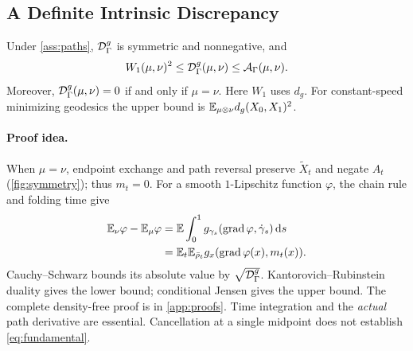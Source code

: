 \subsection{A Definite Intrinsic Discrepancy}

\begin{theorem}
\label{thm:divergence}
Under \cref{ass:paths}, $\mathcal D_\Gamma^g$ is symmetric and nonnegative, and
\begin{equation}
W_1(\mu,\nu)^2\leq\mathcal D_\Gamma^g(\mu,\nu)\leq\mathcal A_\Gamma(\mu,\nu).
\label{eq:bounds}
\end{equation}
Moreover, $\mathcal D_\Gamma^g(\mu,\nu)=0$ if and only if $\mu=\nu$. Here $W_1$ uses $d_g$. For constant-speed minimizing geodesics the upper bound is $\mathbb E_{\mu\otimes\nu}d_g(X_0,X_1)^2$.
\end{theorem}

\paragraph{Proof idea.}
When $\mu=\nu$, endpoint exchange and path reversal preserve $\widetilde X_t$ and negate $A_t$ (\cref{fig:symmetry}); thus $m_t=0$. For a smooth $1$-Lipschitz function $\varphi$, the chain rule and folding time give
\begin{align}
\mathbb E_\nu\varphi-\mathbb E_\mu\varphi
&=\mathbb E\int_0^1 g_{\gamma_s}(\operatorname{grad}\varphi,\dot\gamma_s)\,\mathrm d s\notag\\
&=\mathbb E_t\mathbb E_{\bar\rho_t}g_x(\operatorname{grad}\varphi(x),m_t(x)).
\label{eq:fundamental}
\end{align}
Cauchy--Schwarz bounds its absolute value by $\sqrt{\mathcal D_\Gamma^g}$. Kantorovich--Rubinstein duality gives the lower bound; conditional Jensen gives the upper bound. The complete density-free proof is in \cref{app:proofs}. Time integration and the \emph{actual} path derivative are essential. Cancellation at a single midpoint does not establish \cref{eq:fundamental}.

